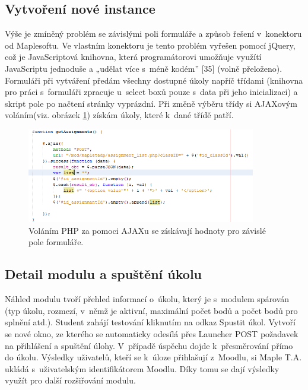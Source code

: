 \documentclass[
print,
  11pt,
  table,   
  nolof,    
  nolot,
  oneside,
  draft
]{fithesis3}
\begin{document}
\subsection{Vytvoření nové instance}
Výše je zmíněný problém se závislými poli formuláře a způsob řešení v~konektoru od Maplesoftu. Ve vlastním konektoru je tento problém vyřešen pomocí jQuery, což je JavaScriptová knihovna, která programátorovi umožňuje využítí JavaScriptu jednoduše a „udělat více s~méně kodém” [35] (volně přeloženo). Formuláři při vytváření předám všechny dostupné úkoly napříč třídami (knihovna pro práci s~formuláři zpracuje u~select boxů pouze s~data při jeho inicializaci) a skript pole po načtení stránky vyprázdní. Při změně výběru třídy si AJAXovým voláním(viz. obrázek \ref{fig:volaniajax}) získám úkoly, které k~dané třídě patří.
		\begin{figure}
		  \begin{center}
		    \includegraphics[width=100mm]{images/ajax-volani.png}
		   \end{center}
		  \caption{Voláním PHP za pomoci AJAXu se získávají hodnoty pro závislé pole formuláře.}
		  \label{fig:volaniajax}
		\end{figure}

		\subsection{Detail modulu a spuštění úkolu}
Náhled modulu tvoří přehled informací o~úkolu, který je s~modulem spárován (typ úkolu, rozmezí, v~němž je aktivní, maximální počet bodů a počet bodů pro splnění atd.). Student zahájí testování kliknutím na odkaz Spustit úkol. Vytvoří se nové okno, ze kterého se automaticky odesílá přes Launcher POST požadavek na přihlášení a spuštění úlohy. V~případě úspěchu dojde k~přesměrování přímo do úkolu. Výsledky uživatelů, kteří se k~úloze přihlašují z~Moodlu, si Maple T.A. ukládá s~uživatelským identifikátorem Moodlu. Díky tomu se dají výsledky využít pro další rozšiřování modulu.
\end{document}
